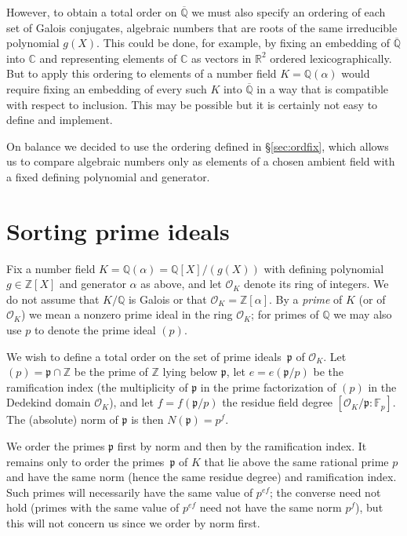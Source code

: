 \documentclass{article}
\def\Sage{{\tt Sage}}
\def\Z{{\mathbb Z}}
\def\Q{{\mathbb Q}}
\def\R{{\mathbb R}}
\def\C{{\mathbb C}}
\def\F{{\mathbb F}}
\def\OO{{\mathcal O}}
\def\p{{\mathfrak p}}
\def\Qbar{\overline{\Q}}
\begin{document}
However, to obtain a total order on $\Qbar$ we must also specify an
ordering of each set of Galois conjugates, algebraic numbers that are
roots of the same irreducible polynomial $g(X)$.  This could be done,
for example, by fixing an embedding of $\Qbar$ into $\C$ and
representing elements of $\C$ as vectors in $\R^2$ ordered
lexicographically. But to apply this ordering to elements of a number
field $K=\Q(\alpha)$ would require fixing an embedding of every such
$K$ into $\Qbar$ in a way that is compatible with respect to
inclusion.  This may be possible but it is certainly not easy to
define and implement.

On balance we decided to use the ordering defined in \S\ref{sec:ordfix}, which allows us to compare algebraic numbers only as elements of a chosen ambient field with a fixed defining polynomial and generator.

\section{Sorting prime ideals}\label{sec:primes}
Fix a number field $K=\Q(\alpha)=\Q[X]/(g(X))$ with defining
polynomial $g\in\Z[X]$ and generator $\alpha$ as above, and let
$\OO_K$ denote its ring of integers.  We do not assume that $K/\Q$ is
Galois or that $\OO_K=\Z[\alpha]$.  By a \emph{prime} of $K$ (or of
$\OO_K$) we mean a nonzero prime ideal in the ring $\OO_K$; for primes
of $\Q$ we may also use $p$ to denote the prime ideal $(p)$.

We wish to define a total order on the set of prime ideals~$\p$
of $\OO_K$.  Let $(p)=\p\cap \Z$ be the prime of $\Z$ lying below $\p$,
let $e=e(\p/p)$ be the ramification index (the multiplicity of $\p$ in the prime factorization of $(p)$ in the Dedekind domain $\OO_K$), and let $f=f(\p/p)$ the residue field degree $[\OO_K/\p:\F_p]$.
The (absolute) norm of $\p$ is then $N(\p)=p^f$.


We order the primes $\p$ first by norm and then by the ramification
index.  It remains only to order the primes~$\p$ of $K$ that lie above
the same rational prime $p$ and have the same norm (hence the same
residue degree) and ramification index.  Such primes will necessarily
have the same value of $p^{ef}$; the converse need not hold (primes
with the same value of $p^{ef}$ need not have the same norm $p^{f}$),
but this will not concern us since we order by norm first.
\end{document}
